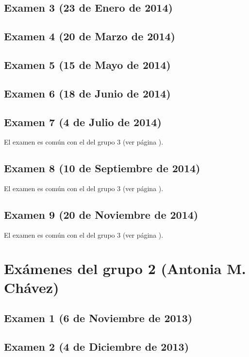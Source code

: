 \documentclass[a4paper,12pt,twoside]{book}
\begin{document}
\subsection{Examen 3 (23 de Enero de 2014)}
 \label{examen_13_14_1_3}
\subsection{Examen 4 (20 de Marzo de 2014)}
\subsection{Examen 5 (15 de Mayo de 2014)}
\subsection{Examen 6 (18 de Junio de 2014)}
 \label{examen_13_14_1_6}
\subsection{Examen 7 (4 de Julio de 2014)}
El examen es común con el del grupo 3 (ver página \pageref{examen_13_14_3_7}). 
\subsection{Examen 8 (10 de Septiembre de 2014)}
El examen es común con el del grupo 3 (ver página \pageref{examen_13_14_3_8}). 
\subsection{Examen 9 (20 de Noviembre de 2014)}
El examen es común con el del grupo 3 (ver página \pageref{examen_13_14_3_9}). 

\section{Exámenes del grupo 2 (Antonia M. Chávez)}
\subsection{Examen 1 (6 de Noviembre de 2013)}
\subsection{Examen 2 (4 de Diciembre de 2013)}
\end{document}
